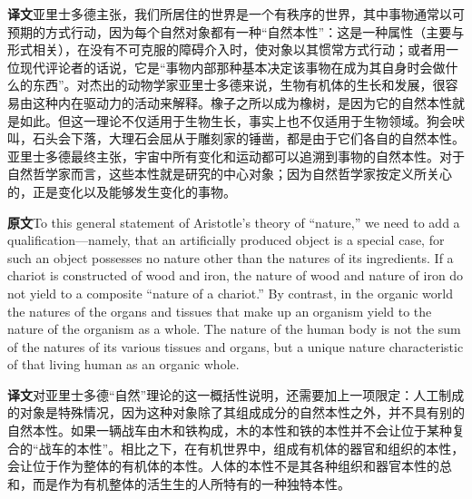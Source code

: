 \documentclass[UTF8,zihao=-4]{ctexart}
\newcommand{\BodyFont}{\fontsize{10.5pt}{15.5pt}\selectfont}
\newcommand{\origlabel}{\textbf{原文}\quad}
\newcommand{\translabel}{\textbf{译文}\quad}
\newcommand{\orig}{\par\noindent\begingroup\BodyFont\origlabel}
\newcommand{\zhline}[1]{\par\endgroup\noindent\begingroup\BodyFont\translabel #1\par\endgroup\vspace{0.35em}}
\begin{document}
\zhline{亚里士多德主张，我们所居住的世界是一个有秩序的世界，其中事物通常以可预期的方式行动，因为每个自然对象都有一种“自然本性”：这是一种属性（主要与形式相关），在没有不可克服的障碍介入时，使对象以其惯常方式行动；或者用一位现代评论者的话说，它是“事物内部那种基本决定该事物在成为其自身时会做什么的东西”。对杰出的动物学家亚里士多德来说，生物有机体的生长和发展，很容易由这种内在驱动力的活动来解释。橡子之所以成为橡树，是因为它的自然本性就是如此。但这一理论不仅适用于生物生长，事实上也不仅适用于生物领域。狗会吠叫，石头会下落，大理石会屈从于雕刻家的锤凿，都是由于它们各自的自然本性。亚里士多德最终主张，宇宙中所有变化和运动都可以追溯到事物的自然本性。对于自然哲学家而言，这些本性就是研究的中心对象；因为自然哲学家按定义所关心的，正是变化以及能够发生变化的事物。}

\orig To this general statement of Aristotle's theory of ``nature,'' we need to add a qualification---namely, that an artificially produced object is a special case, for such an object possesses no nature other than the natures of its ingredients. If a chariot is constructed of wood and iron, the nature of wood and nature of iron do not yield to a composite ``nature of a chariot.'' By contrast, in the organic world the natures of the organs and tissues that make up an organism yield to the nature of the organism as a whole. The nature of the human body is not the sum of the natures of its various tissues and organs, but a unique nature characteristic of that living human as an organic whole.

\zhline{对亚里士多德“自然”理论的这一概括性说明，还需要加上一项限定：人工制成的对象是特殊情况，因为这种对象除了其组成成分的自然本性之外，并不具有别的自然本性。如果一辆战车由木和铁构成，木的本性和铁的本性并不会让位于某种复合的“战车的本性”。相比之下，在有机世界中，组成有机体的器官和组织的本性，会让位于作为整体的有机体的本性。人体的本性不是其各种组织和器官本性的总和，而是作为有机整体的活生生的人所特有的一种独特本性。}
\end{document}
